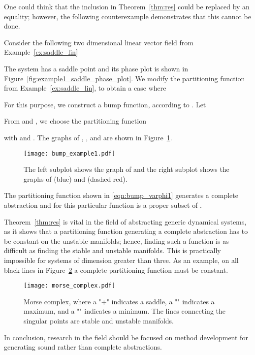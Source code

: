 One could think that the inclusion  in Theorem~\ref{thm:res} could be replaced by an equality; however, the following counterexample demonstrates that this cannot be done.
\begin{example}
Consider the following two dimensional linear vector field from Example~\ref{ex:saddle_lin}

The system has a saddle point  and its phase plot is shown in Figure~\ref{fig:example1_saddle_phase_plot}. We modify the partitioning function  from Example~\ref{ex:saddle_lin}, to obtain a case where

For this purpose, we construct a bump function, according to \cite{An_Introduction_to_Manifolds}. Let

From  and , we choose the partitioning function

with  and . The graphs of , , and  are shown in Figure~\ref{fig:bump_example}.
\begin{figure}[!htb]
    \centering
       \texttt{[image: bump\_example1.pdf]}
    \caption{The left subplot shows the graph of  and the right subplot shows the graphs of   (blue) and  (dashed red).\label{fig:bump_example}}
\end{figure}

The partitioning function shown in \eqref{eqn:bump_varphi1} generates a complete abstraction and for this particular function  is a proper subset of .
\end{example}

Theorem~\ref{thm:res} is vital in the field of abstracting generic dynamical systems, as it shows that a partitioning function generating a complete abstraction has to be constant on the unstable manifolds; hence, finding such a function is as difficult as finding the stable and unstable manifolds. This is practically impossible for systems of dimension greater than three. As an example, on all black lines in Figure~\ref{fig:morse_complex} a complete partitioning function must be constant.
\begin{figure}[!htb]
    \centering
       \texttt{[image: morse\_complex.pdf]}
    \caption{Morse complex, where a "+" indicates a saddle, a "" indicates a maximum, and a "" indicates a minimum. The lines connecting the singular points are stable and unstable manifolds.\label{fig:morse_complex}}
\end{figure}
In conclusion, research in the field should be focused on method development for generating sound rather than complete abstractions.
